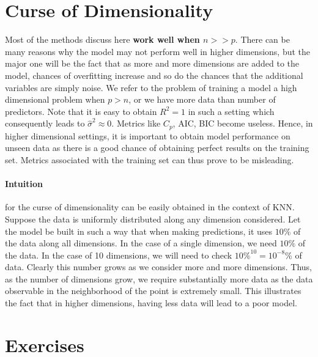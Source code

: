 \documentclass[../statistical_learning_notes.tex]{subfiles}
\begin{document}
    \section{Curse of Dimensionality}
    Most of the methods discuss here \textbf{work well when $n >> p$}. There can be many reasons why the model may not perform well in higher dimensions, but the major one will be the fact that as more and more dimensions are added to the model, chances of overfitting increase and so do the chances that the additional variables are simply noise.\newline
    We refer to the problem of training a model a high dimensional problem when $p > n$, or we have more data than number of predictors. Note that it is easy to obtain $R^{2} = 1$ in such a setting which consequently leads to $\hat{\sigma}^{2} \approx 0$. Metrics like $C_{p}$, AIC, BIC become useless.\newline
    Hence, in higher dimensional settings, it is important to obtain model performance on unseen data as there is a good chance of obtaining perfect results on the training set. Metrics associated with the training set can thus prove to be misleading.

    \paragraph{Intuition} for the curse of dimensionality can be easily obtained in the context of KNN.\newline
    Suppose the data is uniformly distributed along any dimension considered. Let the model be built in such a way that when making predictions, it uses $10\%$ of the data along all dimensions. \newline
    In the case of a single dimension, we need $10\%$ of the data. In the case of 10 dimensions, we will need to check $10\% ^{10} = 10^{-8}\%$ of data. Clearly this number grows as we consider more and more dimensions.\newline
    Thus, as the number of dimensions grow, we require substantially more data as the data observable in the neighborhood of the point is extremely small. This illustrates the fact that in higher dimensions, having less data will lead to a poor model.


    
    \section{Exercises}
\end{document}
